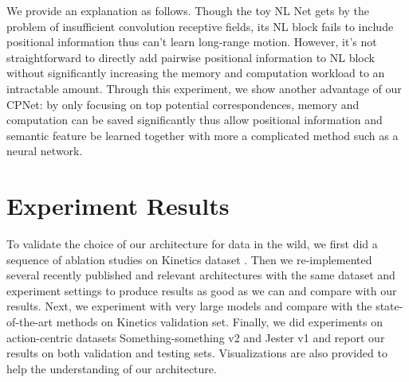 \documentclass[10pt,twocolumn,letterpaper]{article}
\begin{document}
We provide an explanation as follows. Though the toy NL Net gets by the problem of insufficient convolution receptive fields, its NL block fails to include positional information thus can't learn long-range motion. 
However, it's not straightforward to directly add pairwise positional information to NL block without significantly increasing the memory and computation workload to an intractable amount.
Through this experiment, we show another advantage of our CPNet: by only focusing on top  potential correspondences, memory and computation can be saved significantly thus allow positional information and semantic feature be learned together with more a complicated method such as a neural network.


\section{Experiment Results}

To validate the choice of our architecture for data in the wild, we first did a sequence of ablation studies on Kinetics dataset \cite{Kinetics}. 
Then we re-implemented several recently published and relevant architectures with the same dataset and experiment settings to produce results as good as we can and compare with our results. 
Next, we experiment with very large models and compare with the state-of-the-art methods on Kinetics validation set.
Finally, we did experiments on action-centric datasets Something-something v2 \cite{Something:Something} and Jester v1 \cite{Jester} and report our results on both validation and testing sets. Visualizations are also provided to help the understanding of our architecture.
\end{document}
